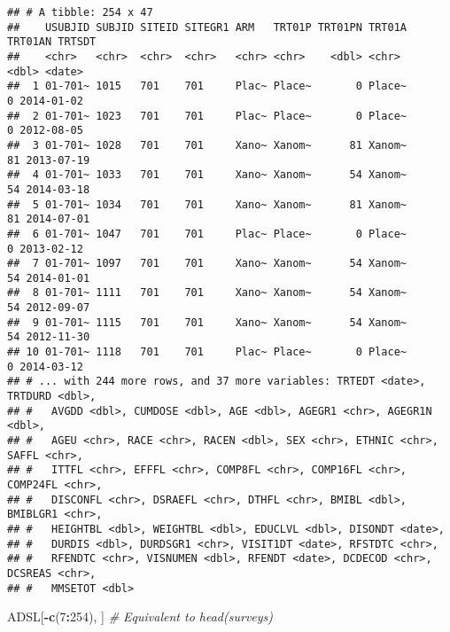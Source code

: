 \documentclass[]{book}
\newenvironment{Shaded}{\begin{snugshade}}{\end{snugshade}}
\newcommand{\CommentTok}[1]{\textcolor[rgb]{0.56,0.35,0.01}{\textit{#1}}}
\newcommand{\DecValTok}[1]{\textcolor[rgb]{0.00,0.00,0.81}{#1}}
\newcommand{\KeywordTok}[1]{\textcolor[rgb]{0.13,0.29,0.53}{\textbf{#1}}}
\newcommand{\NormalTok}[1]{#1}
\newcommand{\OperatorTok}[1]{\textcolor[rgb]{0.81,0.36,0.00}{\textbf{#1}}}
\begin{document}
\begin{verbatim}
## # A tibble: 254 x 47
##    USUBJID SUBJID SITEID SITEGR1 ARM   TRT01P TRT01PN TRT01A TRT01AN TRTSDT    
##    <chr>   <chr>  <chr>  <chr>   <chr> <chr>    <dbl> <chr>    <dbl> <date>    
##  1 01-701~ 1015   701    701     Plac~ Place~       0 Place~       0 2014-01-02
##  2 01-701~ 1023   701    701     Plac~ Place~       0 Place~       0 2012-08-05
##  3 01-701~ 1028   701    701     Xano~ Xanom~      81 Xanom~      81 2013-07-19
##  4 01-701~ 1033   701    701     Xano~ Xanom~      54 Xanom~      54 2014-03-18
##  5 01-701~ 1034   701    701     Xano~ Xanom~      81 Xanom~      81 2014-07-01
##  6 01-701~ 1047   701    701     Plac~ Place~       0 Place~       0 2013-02-12
##  7 01-701~ 1097   701    701     Xano~ Xanom~      54 Xanom~      54 2014-01-01
##  8 01-701~ 1111   701    701     Xano~ Xanom~      54 Xanom~      54 2012-09-07
##  9 01-701~ 1115   701    701     Xano~ Xanom~      54 Xanom~      54 2012-11-30
## 10 01-701~ 1118   701    701     Plac~ Place~       0 Place~       0 2014-03-12
## # ... with 244 more rows, and 37 more variables: TRTEDT <date>, TRTDURD <dbl>,
## #   AVGDD <dbl>, CUMDOSE <dbl>, AGE <dbl>, AGEGR1 <chr>, AGEGR1N <dbl>,
## #   AGEU <chr>, RACE <chr>, RACEN <dbl>, SEX <chr>, ETHNIC <chr>, SAFFL <chr>,
## #   ITTFL <chr>, EFFFL <chr>, COMP8FL <chr>, COMP16FL <chr>, COMP24FL <chr>,
## #   DISCONFL <chr>, DSRAEFL <chr>, DTHFL <chr>, BMIBL <dbl>, BMIBLGR1 <chr>,
## #   HEIGHTBL <dbl>, WEIGHTBL <dbl>, EDUCLVL <dbl>, DISONDT <date>,
## #   DURDIS <dbl>, DURDSGR1 <chr>, VISIT1DT <date>, RFSTDTC <chr>,
## #   RFENDTC <chr>, VISNUMEN <dbl>, RFENDT <date>, DCDECOD <chr>, DCSREAS <chr>,
## #   MMSETOT <dbl>
\end{verbatim}

\begin{Shaded}
\begin{Highlighting}[]
\NormalTok{ADSL[}\OperatorTok{-}\KeywordTok{c}\NormalTok{(}\DecValTok{7}\OperatorTok{:}\DecValTok{254}\NormalTok{), ]   }\CommentTok{# Equivalent to head(surveys)}
\end{Highlighting}
\end{Shaded}
\end{document}
